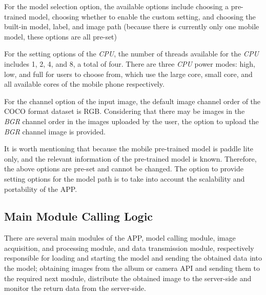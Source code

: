 For the model selection option, the available options include choosing a pre-trained model, choosing whether to enable the custom setting, and choosing the built-in model, label, and image path (because there is currently only one mobile model, these options are all pre-set)


For the setting options of the \textit{CPU}, the number of threads available for the \textit{CPU} includes 1, 2, 4, and 8, a total of four. There are three \textit{CPU} power modes: high, low, and full for users to choose from, which use the large core, small core, and all available cores of the mobile phone respectively.


For the channel option of the input image, the default image channel order of the COCO format dataset is RGB. Considering that there may be images in the \textit{BGR} channel order in the images uploaded by the user, the option to upload the \textit{BGR} channel image is provided.


It is worth mentioning that because the mobile pre-trained model is paddle lite only, and the relevant information of the pre-trained model is known. Therefore, the above options are pre-set and cannot be changed. The option to provide setting options for the model path is to take into account the scalability and portability of the APP.

\subsection{Main Module Calling Logic}

There are several main modules of the APP, model calling module, image acquisition, and processing module, and data transmission module, respectively responsible for loading and starting the model and sending the obtained data into the model; obtaining images from the album or camera API and sending them to the required next module, distribute the obtained image to the server-side and monitor the return data from the server-side.

